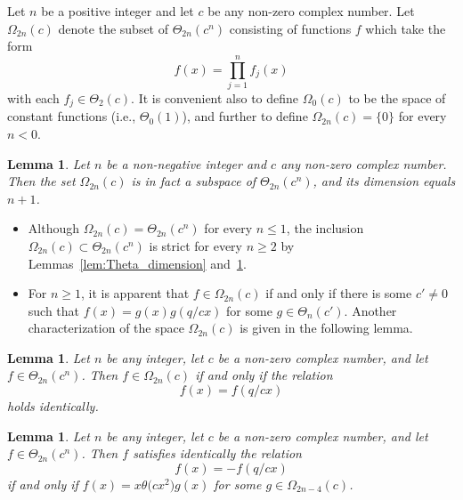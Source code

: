 \documentclass[pdftex]{sigma}
\numberwithin{equation}{section}
\newtheorem{Lemma}[Theorem]{Lemma}
\begin{document}
\begin{Definition} \label{def:Omega}
Let $n$ be a positive integer and let $c$ be any non-zero complex number. Let~$\Omega_{2n}(c)$ denote the subset of $\Theta_{2n}(c^n)$ consisting of functions $f$ which take the form
\[%
f(x) = \prod_{j=1}^n f_j(x)
\]
with each $f_j \in \Theta_2(c)$. It is convenient also to define $\Omega_0(c)$ to be the space of constant functions (i.e., $\Theta_0(1)$), and further to define $\Omega_{2n}(c) = \{0\}$ for every $n<0$.
\end{Definition}

\begin{Lemma} \label{lem:omega_dim}
Let $n$ be a non-negative integer and $c$ any non-zero complex number. Then the set $\Omega_{2n}(c)$ is in fact a subspace of $\Theta_{2n}(c^n)$, and its dimension equals $n+1$.
\end{Lemma}

\begin{Remark}\quad
\begin{itemize}\itemsep=0pt
\item[(i)] Although $\Omega_{2n}(c) = \Theta_{2n}(c^n)$ for every $n \leq 1$, the inclusion $\Omega_{2n}(c) \subset \Theta_{2n}(c^n)$ is strict for every $n \geq 2$ by Lemmas~\ref{lem:Theta_dimension} and~\ref{lem:omega_dim}.
\item[(ii)] For $n \geq 1$, it is apparent that $f \in \Omega_{2n}(c)$ if and only if there is some $c' \neq 0$ such that $f(x) = g(x) g(q/cx)$ for some $g \in \Theta_n(c')$. Another characterization of the space $\Omega_{2n}(c)$ is given in the following lemma.
\end{itemize}
\end{Remark}

\begin{Lemma} \label{lem:Omega_characterization}
Let $n$ be any integer, let $c$ be a non-zero complex number, and let $f \in \Theta_{2n}(c^n)$. Then $f \in \Omega_{2n}(c)$ if and only if the relation
\begin{equation} \label{eqn:2nth_order_theta_reciprocal_relation}
f(x) = f(q/cx)
\end{equation}
holds identically.
\end{Lemma}

\begin{Lemma} \label{lem:Omega_characterization_with_sign_changed}
Let $n$ be any integer, let $c$ be a non-zero complex number, and let $f \in \Theta_{2n}(c^n)$. Then $f$ satisfies identically the relation
\begin{equation} \label{eqn:2nth_order_theta_reciprocal_relation_with_minus}
f(x) = -f(q/cx)
\end{equation}
if and only if $f(x) = x\theta\big(cx^2\big) g(x)$ for some $g \in \Omega_{2n-4}(c)$.
\end{Lemma}
\end{document}
